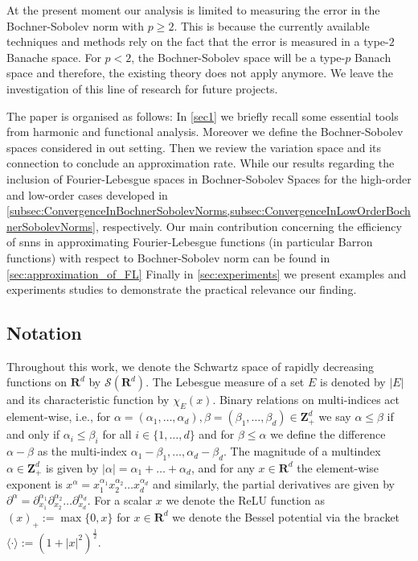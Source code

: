 \documentclass[a4paper]{article}
\newcommand{\rr}[1]{\mathbf{R}^{#1}}
\newcommand{\zzp}[1]{\mathbf{Z}_+^{#1}}
\newcommand{\eabs}[1]{\langle #1\rangle}     %
\numberwithin{equation}{section}
\theoremstyle{remark}
\begin{document}
At the present moment our analysis
is limited to measuring the error
in the Bochner-Sobolev norm with $p\geq 2$.
This is because the currently available
techniques and methods rely on the fact
that the error is measured in a type-$2$ Banache space.
For $p<2$, the Bochner-Sobolev space
will be a type-$p$ Banach space and therefore,
the existing theory does not apply anymore.
We leave the investigation of this line of research for future projects.

The paper is organised as follows: In \cref{sec1} we briefly
recall some essential tools from harmonic and functional analysis.
Moreover we define the Bochner-Sobolev spaces considered in out setting.
Then we review the variation space and its connection
to conclude an approximation rate.
While our results regarding the
inclusion of Fourier-Lebesgue spaces in Bochner-Sobolev Spaces
for the high-order and low-order cases 
developed in \cref{subsec:ConvergenceInBochnerSobolevNorms,subsec:ConvergenceInLowOrderBochnerSobolevNorms}, 
respectively.
Our main contribution concerning the efficiency of
\glspl{snn} in approximating Fourier-Lebesgue functions
(in particular Barron functions)
with respect to Bochner-Sobolev norm can be found in 
\cref{sec:approximation_of_FL}
Finally in \cref{sec:experiments}
we present examples and experiments studies
to demonstrate the practical relevance
our finding.

\subsection{Notation}
Throughout this work, we denote the Schwartz space
of rapidly decreasing functions
on $\rr{d}$ by $\mathscr{S}(\rr{d})$.
The Lebesgue measure of a set $E$ is denoted by $|E|$ and its characteristic function by $\chi_E(x)$.
Binary relations on multi-indices act element-wise, i.e., for
$\alpha=(\alpha_1,\dots, \alpha_d),\beta =(\beta_1,\dots, \beta_d)\in \zzp{d}$
we say
\(\alpha \leq \beta\)
if and only if 
\(\alpha_i\leq \beta_i\)
for all 
\(i \in \{1, \dots, d\}
\)
and for $\beta\leq\alpha$ we define the difference 
\(\alpha-\beta\) as the multi-index
\(\alpha_1-\beta_1,\dots, \alpha_d-\beta_d\).
The magnitude of a multindex $\alpha\in\zzp{d}$ is given by
\(|\alpha| = \alpha_1+\dots+\alpha_d\),
and for any \(x\in \rr{d}\)
the element-wise exponent is
\(
x^\alpha = x_1^{\alpha_1}x_2^{\alpha_2}\dots x_d^{\alpha_d}
\)
and similarly, the partial derivatives are given by
\(\partial ^\alpha = \partial_{x_1}^{\alpha_1}\partial_{x_2}^{\alpha_2}
\dots \partial_{x_d}^{\alpha_d}\).
For a scalar $x$ we denote the ReLU function as $(x)_+:=\max\{0,x\}$ for $x\in\rr{d}$ we denote the Bessel potential via the bracket $\eabs{\cdot} := (1+|x|^2)^{\frac{1}{2}} $.
\end{document}
